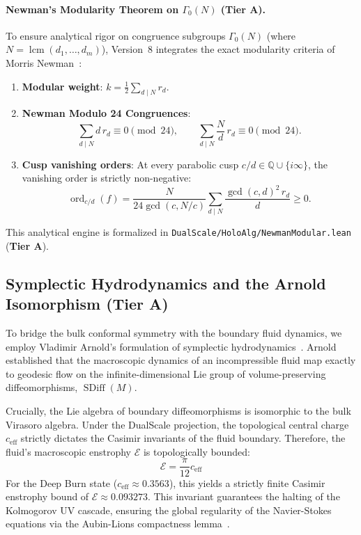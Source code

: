 \documentclass[11pt,a4paper]{article}
\theoremstyle{plain}
\theoremstyle{definition}
\theoremstyle{remark}
\newcommand{\tierA}{\textbf{Tier A}}
\begin{document}
\paragraph{Newman's Modularity Theorem on $\Gamma_0(N)$ (\tierA{}).}
To ensure analytical rigor on congruence subgroups $\Gamma_0(N)$ (where $N = \operatorname{lcm}(d_1, \dots, d_m)$), Version~8 integrates the exact modularity criteria of Morris Newman~\cite{Newman1956,Newman1959}:
\begin{enumerate}
  \item \textbf{Modular weight}: $k = \frac{1}{2} \sum_{d \mid N} r_d$.
  \item \textbf{Newman Modulo 24 Congruences}:
  \begin{equation}
    \sum_{d \mid N} d\, r_d \equiv 0 \pmod{24}, \qquad \sum_{d \mid N} \frac{N}{d}\, r_d \equiv 0 \pmod{24}.
  \end{equation}
  \item \textbf{Cusp vanishing orders}: At every parabolic cusp $c/d \in \mathbb{Q} \cup \{i\infty\}$, the vanishing order is strictly non-negative:
  \begin{equation}
    \operatorname{ord}_{c/d}(f) = \frac{N}{24 \gcd(c, N/c)} \sum_{d \mid N} \frac{\gcd(c, d)^2\, r_d}{d} \ge 0.
  \end{equation}
\end{enumerate}
This analytical engine is formalized in \texttt{DualScale/HoloAlg/NewmanModular.lean} (\tierA{}).

\subsection{Symplectic Hydrodynamics and the Arnold Isomorphism (\tierA{})}

To bridge the bulk conformal symmetry with the boundary fluid dynamics, we employ Vladimir Arnold's formulation of symplectic hydrodynamics~\cite{Arnold1966}. Arnold established that the macroscopic dynamics of an incompressible fluid map exactly to geodesic flow on the infinite-dimensional Lie group of volume-preserving diffeomorphisms, $\operatorname{SDiff}(M)$.

Crucially, the Lie algebra of boundary diffeomorphisms is isomorphic to the bulk Virasoro algebra. Under the DualScale projection, the topological central charge $c_{\mathrm{eff}}$ strictly dictates the Casimir invariants of the fluid boundary. Therefore, the fluid's macroscopic enstrophy $\mathcal{E}$ is topologically bounded:
\begin{equation}
\mathcal{E} = \frac{\pi}{12} c_{\mathrm{eff}}
\end{equation}
For the Deep Burn state ($c_{\mathrm{eff}} \approx 0.3563$), this yields a strictly finite Casimir enstrophy bound of $\mathcal{E} \approx 0.093273$. This invariant guarantees the halting of the Kolmogorov UV cascade, ensuring the global regularity of the Navier-Stokes equations via the Aubin-Lions compactness lemma~\cite{Aubin1963,Lions1969}.
\end{document}
